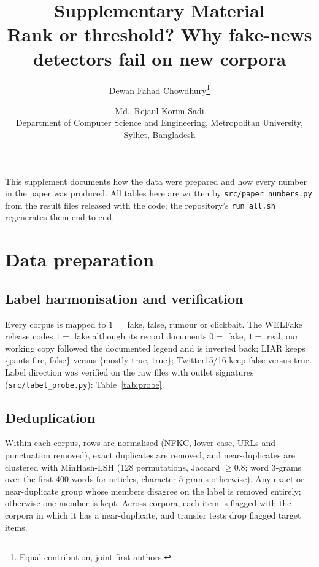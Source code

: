 \documentclass[11pt]{article}
\title{Supplementary Material\\[4pt]\large Rank or threshold? Why fake-news detectors fail on new corpora}
\author{Dewan Fahad Chowdhury\thanks{Equal contribution, joint first authors.} \and Md.\ Rejaul Korim Sadi\footnotemark[1]\\[2pt]
\small Department of Computer Science and Engineering, Metropolitan University, Sylhet, Bangladesh}
\date{}
\begin{document}
\maketitle

\noindent This supplement documents how the data were prepared and how every number in the paper was produced. All tables here are written by \texttt{src/paper\_numbers.py} from the result files released with the code; the repository's \texttt{run\_all.sh} regenerates them end to end.

\section{Data preparation}
\subsection{Label harmonisation and verification}
Every corpus is mapped to $1=$ fake, false, rumour or clickbait. The WELFake release codes $1=$ fake although its record documents $0=$ fake, $1=$ real; our working copy followed the documented legend and is inverted back; LIAR keeps \{pants-fire, false\} versus \{mostly-true, true\}; Twitter15/16 keep false versus true. Label direction was verified on the raw files with outlet signatures (\texttt{src/label\_probe.py}): Table~\ref{tab:probe}.


\subsection{Deduplication}
Within each corpus, rows are normalised (NFKC, lower case, URLs and punctuation removed), exact duplicates are removed, and near-duplicates are clustered with MinHash-LSH (128 permutations, Jaccard $\geq 0.8$; word 3-grams over the first 400 words for articles, character 5-grams otherwise). Any exact or near-duplicate group whose members disagree on the label is removed entirely; otherwise one member is kept. Across corpora, each item is flagged with the corpora in which it has a near-duplicate, and transfer tests drop flagged target items.

\end{document}
